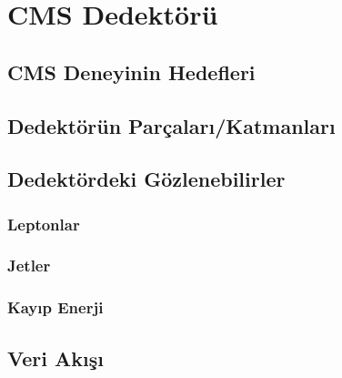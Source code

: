 \chapter{CMS Dedektörü}
\section{CMS Deneyinin Hedefleri}
\lipsum[2-3]
\section{Dedektörün Parçaları/Katmanları}
\lipsum[2-3]
\section{Dedektördeki Gözlenebilirler}
\lipsum[2-3]
\subsection{Leptonlar}
\lipsum[2-3]
\subsection{Jetler}
\lipsum[2-3]
\subsection{Kayıp Enerji}
\lipsum[2-3]
\section{Veri Akışı}
\lipsum[2-3]